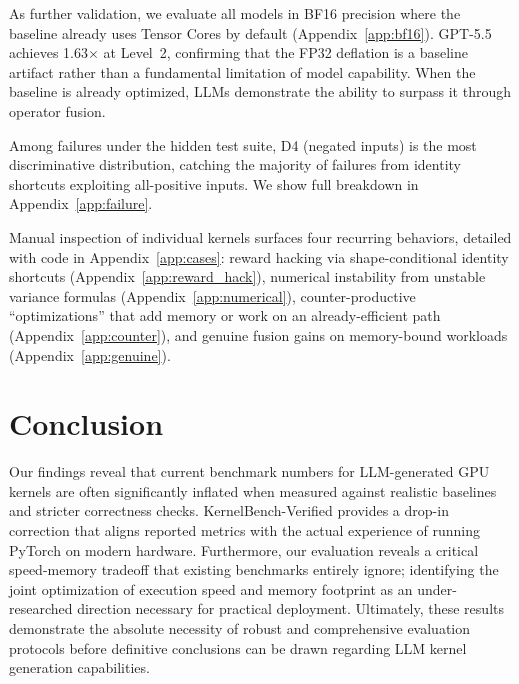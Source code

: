 \documentclass[]{fairmeta}
\begin{document}
As further validation, we evaluate all models in BF16 precision where the baseline already uses Tensor Cores by default (Appendix~\ref{app:bf16}). GPT-5.5 achieves 1.63$\times$ at Level~2, confirming that the FP32 deflation is a baseline artifact rather than a fundamental limitation of model capability. When the baseline is already optimized, LLMs demonstrate the ability to surpass it through operator fusion.

Among failures under the hidden test suite, D4 (negated inputs) is the most discriminative distribution, catching the majority of failures from identity shortcuts exploiting all-positive inputs. We show full breakdown in Appendix~\ref{app:failure}.

Manual inspection of individual kernels surfaces four recurring behaviors, detailed with code in Appendix~\ref{app:cases}: reward hacking via shape-conditional identity shortcuts (Appendix~\ref{app:reward_hack}), numerical instability from unstable variance formulas (Appendix~\ref{app:numerical}), counter-productive ``optimizations'' that add memory or work on an already-efficient path (Appendix~\ref{app:counter}), and genuine fusion gains on memory-bound workloads (Appendix~\ref{app:genuine}).

\section{Conclusion}
\label{sec:conclusion}

Our findings reveal that current benchmark numbers for LLM-generated GPU kernels are often significantly inflated when measured against realistic baselines and stricter correctness checks. KernelBench-Verified provides a drop-in correction that aligns reported metrics with the actual experience of running PyTorch on modern hardware. Furthermore, our evaluation reveals a critical speed-memory tradeoff that existing benchmarks entirely ignore; identifying the joint optimization of execution speed and memory footprint as an under-researched direction necessary for practical deployment. Ultimately, these results demonstrate the absolute necessity of robust and comprehensive evaluation protocols before definitive conclusions can be drawn regarding LLM kernel generation capabilities.
\end{document}
